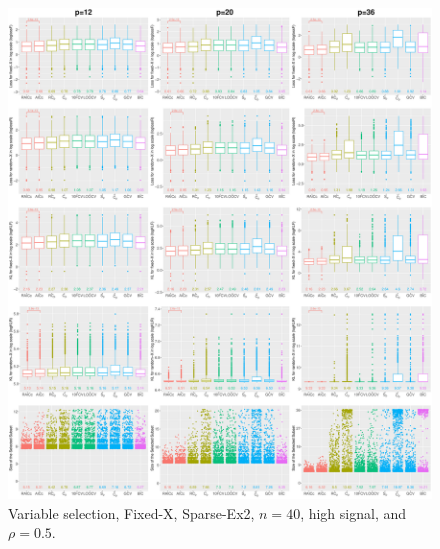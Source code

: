 \begin{figure}[!ht]
\centering
\includegraphics[width=\textwidth]{figures/supplement/fixedx/subset_selection/Sparse-Ex2_n40_hsnr_rho05.eps}
\caption{Variable selection, Fixed-X, Sparse-Ex2, $n=40$, high signal, and $\rho=0.5$.}
\end{figure}
\clearpage
